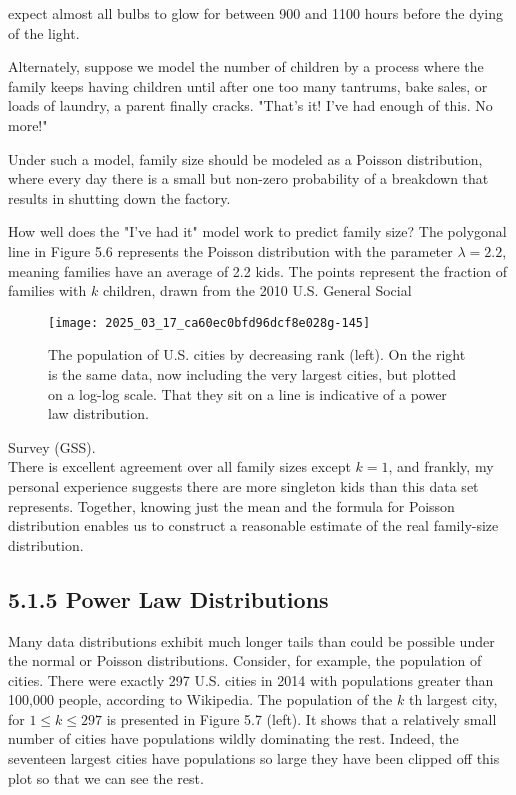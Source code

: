 \documentclass[10pt]{article}
\begin{document}
expect almost all bulbs to glow for between 900 and 1100 hours before the dying of the light.

Alternately, suppose we model the number of children by a process where the family keeps having children until after one too many tantrums, bake sales, or loads of laundry, a parent finally cracks. "That's it! I've had enough of this. No more!"

Under such a model, family size should be modeled as a Poisson distribution, where every day there is a small but non-zero probability of a breakdown that results in shutting down the factory.

How well does the "I've had it" model work to predict family size? The polygonal line in Figure 5.6 represents the Poisson distribution with the parameter $\lambda=2.2$, meaning families have an average of 2.2 kids. The points represent the fraction of families with $k$ children, drawn from the 2010 U.S. General Social\\
\begin{figure}[h]
\centering
\texttt{[image: 2025\_03\_17\_ca60ec0bfd96dcf8e028g-145]}
\caption{The population of U.S. cities by decreasing rank (left). On the right is the same data, now including the very largest cities, but plotted on a log-log scale. That they sit on a line is indicative of a power law distribution.}
\end{figure}

Survey (GSS).\\
There is excellent agreement over all family sizes except $k=1$, and frankly, my personal experience suggests there are more singleton kids than this data set represents. Together, knowing just the mean and the formula for Poisson distribution enables us to construct a reasonable estimate of the real family-size distribution.

\subsection*{5.1.5 Power Law Distributions}
Many data distributions exhibit much longer tails than could be possible under the normal or Poisson distributions. Consider, for example, the population of cities. There were exactly 297 U.S. cities in 2014 with populations greater than 100,000 people, according to Wikipedia. The population of the $k$ th largest city, for $1 \leq k \leq 297$ is presented in Figure 5.7 (left). It shows that a relatively small number of cities have populations wildly dominating the rest. Indeed, the seventeen largest cities have populations so large they have been clipped off this plot so that we can see the rest.
\end{document}
